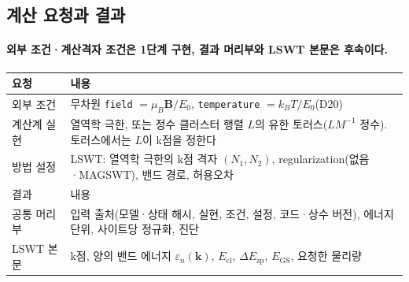 \subsection{계산 요청과 결과}\label{request-result}
\begingroup%
  \framesubtitle{외부 조건·계산격자 조건은 1단계 구현, 결과 머리부와 LSWT 본문은 후속이다.}
  \small
  \begin{tabularx}{\textwidth}{@{}p{2.3cm}Y@{}}
    \toprule
    요청 & 내용 \\
    \midrule
    외부 조건 & 무차원 \texttt{field} $=\mu_B\mathbf B/E_0$, \texttt{temperature} $=k_BT/E_0$(D20) \\
    계산계 실현 & 열역학 극한, 또는 정수 클러스터 행렬 $L$의 유한 토러스($LM^{-1}$ 정수). 토러스에서는 $L$이 k점을 정한다 \\
    방법 설정 & LSWT: 열역학 극한의 k점 격자 $(N_1,N_2)$, regularization(없음·MAGSWT), 밴드 경로, 허용오차 \\
    \midrule
    결과 & 내용 \\
    \midrule
    공통 머리부 & 입력 출처(모델·상태 해시, 실현, 조건, 설정, 코드·상수 버전), 에너지 단위, 사이트당 정규화, 진단 \\
    LSWT 본문 & k점, 양의 밴드 에너지 $\varepsilon_n(\mathbf k)$, $E_{\mathrm{cl}}$, $\Delta E_{\mathrm{zp}}$, $E_{\mathrm{GS}}$, 요청한 물리량 \\
    \bottomrule
  \end{tabularx}
  \par\medskip
\endgroup

